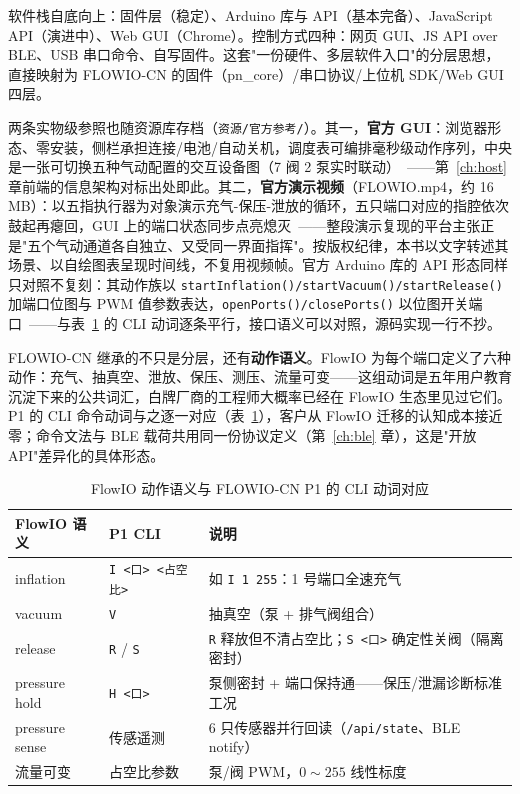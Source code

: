 软件栈自底向上：固件层（稳定）、Arduino 库与 API（基本完备）、JavaScript API（演进中）、Web GUI（Chrome）。控制方式四种：网页 GUI、JS API over BLE、USB 串口命令、自写固件。这套"一份硬件、多层软件入口"的分层思想，直接映射为 FLOWIO-CN 的固件（pn\_core）/串口协议/上位机 SDK/Web GUI 四层。

两条实物级参照也随资源库存档（\texttt{资源/官方参考/}）。其一，\textbf{官方 GUI}：浏览器形态、零安装，侧栏承担连接/电池/自动关机，调度表可编排毫秒级动作序列，中央是一张可切换五种气动配置的交互设备图（7 阀 2 泵实时联动）~\cite{flowio-docs-stack}——第~\ref{ch:host} 章前端的信息架构对标出处即此。其二，\textbf{官方演示视频}（FLOWIO.mp4，约 16\,MB）：以五指执行器为对象演示充气-保压-泄放的循环，五只端口对应的指腔依次鼓起再瘪回，GUI 上的端口状态同步点亮熄灭~\cite{Shtarbanov2021}——整段演示复现的平台主张正是"五个气动通道各自独立、又受同一界面指挥"。按版权纪律，本书以文字转述其场景、以自绘图表呈现时间线，不复用视频帧。官方 Arduino 库的 API 形态同样只对照不复刻：其动作族以 \texttt{startInflation()/startVacuum()/startRelease()} 加端口位图与 PWM 值参数表达，\texttt{openPorts()/closePorts()} 以位图开关端口~\cite{flowio-arduino-lib}——与表~\ref{tab:intro-api} 的 CLI 动词逐条平行，接口语义可以对照，源码实现一行不抄。

FLOWIO-CN 继承的不只是分层，还有\textbf{动作语义}。FlowIO 为每个端口定义了六种动作：充气、抽真空、泄放、保压、测压、流量可变——这组动词是五年用户教育沉淀下来的公共词汇，白牌厂商的工程师大概率已经在 FlowIO 生态里见过它们。P1 的 CLI 命令动词与之逐一对应（表~\ref{tab:intro-api}），客户从 FlowIO 迁移的认知成本接近零；命令文法与 BLE 载荷共用同一份协议定义（第~\ref{ch:ble} 章），这是"开放 API"差异化的具体形态。

\begin{table}[htbp]
  \centering
  \caption{FlowIO 动作语义与 FLOWIO-CN P1 的 CLI 动词对应}
  \label{tab:intro-api}
  \begin{tabular}{llp{5.6cm}}
    \toprule
    FlowIO 语义 & P1 CLI & 说明 \\
    \midrule
    inflation & \texttt{I <口> <占空比>} & 如 \texttt{I 1 255}：1 号端口全速充气 \\
    vacuum & \texttt{V} & 抽真空（泵 + 排气阀组合） \\
    release & \texttt{R} / \texttt{S} & \texttt{R} 释放但不清占空比；\texttt{S <口>} 确定性关阀（隔离密封） \\
    pressure hold & \texttt{H <口>} & 泵侧密封 + 端口保持通——保压/泄漏诊断标准工况 \\
    pressure sense & 传感遥测 & 6 只传感器并行回读（\texttt{/api/state}、BLE notify） \\
    流量可变 & 占空比参数 & 泵/阀 PWM，$0\sim255$ 线性标度 \\
    \bottomrule
  \end{tabular}
\end{table}

